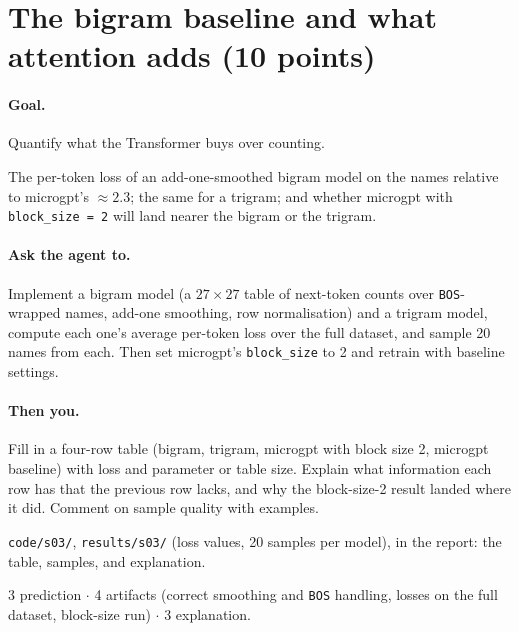 \documentclass[11pt,letterpaper]{article}
\newcommand{\agent}[1]{\paragraph{Ask the agent to.} #1}
\newcommand{\you}[1]{\paragraph{Then you.} #1}
\newcommand{\goal}[1]{\paragraph{Goal.} #1}
\begin{document}
\section{The bigram baseline and what attention adds \hfill (10 points)}
\goal{Quantify what the Transformer buys over counting.}
\begin{predict}
The per-token loss of an add-one-smoothed bigram model on the names relative to microgpt's $\approx 2.3$; the same for a trigram; and whether microgpt with \texttt{block\_size = 2} will land nearer the bigram or the trigram.
\end{predict}
\agent{Implement a bigram model (a $27\times 27$ table of next-token counts over \texttt{BOS}-wrapped names, add-one smoothing, row normalisation) and a trigram model, compute each one's average per-token loss over the full dataset, and sample 20 names from each. Then set microgpt's \texttt{block\_size} to 2 and retrain with baseline settings.}
\you{Fill in a four-row table (bigram, trigram, microgpt with block size 2, microgpt baseline) with loss and parameter or table size. Explain what information each row has that the previous row lacks, and why the block-size-2 result landed where it did. Comment on sample quality with examples.}
\begin{deliver}
\texttt{code/s03/}, \texttt{results/s03/} (loss values, 20 samples per model), in the report: the table, samples, and explanation.
\end{deliver}
\begin{rubric}3 prediction $\cdot$ 4 artifacts (correct smoothing and \texttt{BOS} handling, losses on the full dataset, block-size run) $\cdot$ 3 explanation.\end{rubric}

\end{document}
